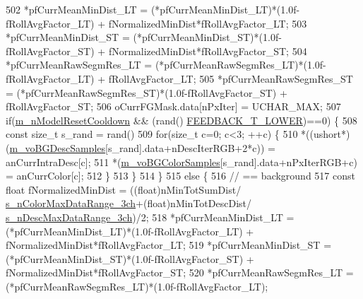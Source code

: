 \begin{DoxyCode}
502                 *pfCurrMeanMinDist\_LT = (*pfCurrMeanMinDist\_LT)*(1.0f-fRollAvgFactor\_LT) + 
      fNormalizedMinDist*fRollAvgFactor\_LT;
503                 *pfCurrMeanMinDist\_ST = (*pfCurrMeanMinDist\_ST)*(1.0f-fRollAvgFactor\_ST) + 
      fNormalizedMinDist*fRollAvgFactor\_ST;
504                 *pfCurrMeanRawSegmRes\_LT = (*pfCurrMeanRawSegmRes\_LT)*(1.0f-fRollAvgFactor\_LT) + 
      fRollAvgFactor\_LT;
505                 *pfCurrMeanRawSegmRes\_ST = (*pfCurrMeanRawSegmRes\_ST)*(1.0f-fRollAvgFactor\_ST) + 
      fRollAvgFactor\_ST;
506                 oCurrFGMask.data[nPxIter] = UCHAR\_MAX;
507                 \textcolor{keywordflow}{if}(\mbox{\hyperlink{class_background_subtractor_l_b_s_p_a5ea18d388afacf8285c46ba0f754e7ee}{m\_nModelResetCooldown}} && (rand()%
      \mbox{\hyperlink{_background_subtractor_su_b_s_e_n_s_e_8cpp_a6975332215c62c3172a76af852bc5566}{FEEDBACK\_T\_LOWER}})==0) \{
508                     \textcolor{keyword}{const} \textcolor{keywordtype}{size\_t} s\_rand = rand()%
509                     \textcolor{keywordflow}{for}(\textcolor{keywordtype}{size\_t} c=0; c<3; ++c) \{
510                         *((ushort*)(\mbox{\hyperlink{class_background_subtractor_su_b_s_e_n_s_e_a422cc2f2a25c07efca02087bd6fe3d6d}{m\_voBGDescSamples}}[s\_rand].data+nDescIterRGB+2*c)) = 
      anCurrIntraDesc[c];
511                         *(\mbox{\hyperlink{class_background_subtractor_su_b_s_e_n_s_e_a9d4d4bb930b34745536b9862683bb539}{m\_voBGColorSamples}}[s\_rand].data+nPxIterRGB+c) = anCurrColor[c];
512                     \}
513                 \}
514             \}
515             \textcolor{keywordflow}{else} \{
516                 \textcolor{comment}{// == background}
517                 \textcolor{keyword}{const} \textcolor{keywordtype}{float} fNormalizedMinDist = ((float)nMinTotSumDist/
      \mbox{\hyperlink{_background_subtractor_su_b_s_e_n_s_e_8cpp_a986ab69736996b917f1e964b2d064aad}{s\_nColorMaxDataRange\_3ch}}+(\textcolor{keywordtype}{float})nMinTotDescDist/
      \mbox{\hyperlink{_background_subtractor_su_b_s_e_n_s_e_8cpp_a5304f7a24033acdfa11a34dcb3d2720e}{s\_nDescMaxDataRange\_3ch}})/2;
518                 *pfCurrMeanMinDist\_LT = (*pfCurrMeanMinDist\_LT)*(1.0f-fRollAvgFactor\_LT) + 
      fNormalizedMinDist*fRollAvgFactor\_LT;
519                 *pfCurrMeanMinDist\_ST = (*pfCurrMeanMinDist\_ST)*(1.0f-fRollAvgFactor\_ST) + 
      fNormalizedMinDist*fRollAvgFactor\_ST;
520                 *pfCurrMeanRawSegmRes\_LT = (*pfCurrMeanRawSegmRes\_LT)*(1.0f-fRollAvgFactor\_LT);

\end{DoxyCode}
